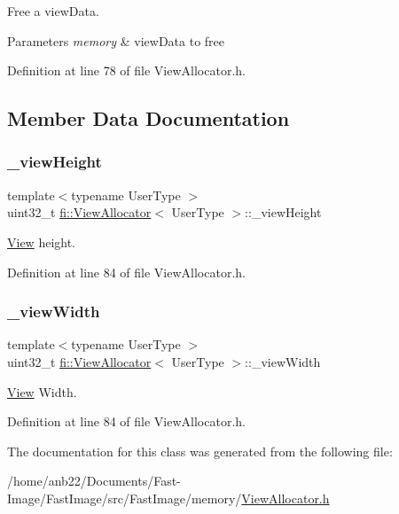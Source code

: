Free a view\+Data. 


\begin{DoxyParams}{Parameters}
{\em memory} & view\+Data to free \\
\hline
\end{DoxyParams}


Definition at line 78 of file View\+Allocator.\+h.



\subsection{Member Data Documentation}
\mbox{\label{classfi_1_1ViewAllocator_a881d0f5707b2eaa7734be0edf66267bc}} 
\subsubsection{\texorpdfstring{\+\_\+view\+Height}{\_viewHeight}}
{\footnotesize\ttfamily template$<$typename User\+Type $>$ \\
uint32\+\_\+t \hyperlink{classfi_1_1ViewAllocator}{fi\+::\+View\+Allocator}$<$ User\+Type $>$\+::\+\_\+view\+Height\hspace{0.3cm}{\ttfamily [private]}}



\hyperlink{classfi_1_1View}{View} height. 



Definition at line 84 of file View\+Allocator.\+h.

\mbox{\label{classfi_1_1ViewAllocator_ace1013f391dd45b3ed672ebf2be47bff}} 
\subsubsection{\texorpdfstring{\+\_\+view\+Width}{\_viewWidth}}
{\footnotesize\ttfamily template$<$typename User\+Type $>$ \\
uint32\+\_\+t \hyperlink{classfi_1_1ViewAllocator}{fi\+::\+View\+Allocator}$<$ User\+Type $>$\+::\+\_\+view\+Width\hspace{0.3cm}{\ttfamily [private]}}



\hyperlink{classfi_1_1View}{View} Width. 



Definition at line 84 of file View\+Allocator.\+h.



The documentation for this class was generated from the following file\+:\begin{DoxyCompactItemize}
\item 
/home/anb22/\+Documents/\+Fast-\/\+Image/\+Fast\+Image/src/\+Fast\+Image/memory/\hyperlink{ViewAllocator_8h}{View\+Allocator.\+h}\end{DoxyCompactItemize}
